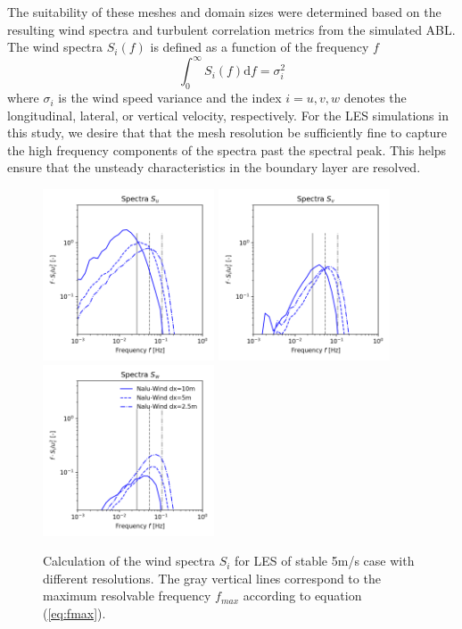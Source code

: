 The suitability of these meshes and domain sizes were determined based
on the resulting wind spectra and turbulent correlation metrics from
the simulated ABL. The wind spectra $S_i(f)$ is defined as a function
of the frequency $f$
\begin{equation}
  \int_0^\infty S_i(f) \textrm{d}f = \sigma_i^2
\end{equation}
where $\sigma_i$ is the wind speed variance and the index $i=u,v,w$
denotes the longitudinal, lateral, or vertical velocity, respectively.
For the LES simulations in this study, we desire that that the mesh
resolution be sufficiently fine to capture the high frequency
components of the spectra past the spectral peak.  This helps ensure
that the unsteady characteristics in the boundary layer are resolved.


\begin{figure}%
  \centering
  \includegraphics[width=2.0in]{figures/GridStudy_Spectra_Su.png}
  \includegraphics[width=2.0in]{figures/GridStudy_Spectra_Sv.png}
  \includegraphics[width=2.0in]{figures/GridStudy_Spectra_Sw.png}
  \caption{   \label{fig:GridStudySpectra} 
    Calculation of the wind spectra $S_i$ for LES of stable
    5m/s case with different resolutions.  The gray vertical lines
    correspond to the maximum resolvable frequency $f_{max}$ according
    to equation (\ref{eq:fmax}). }
\end{figure}

